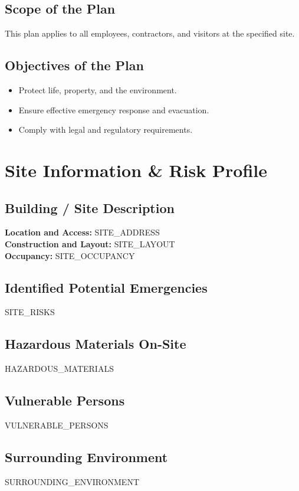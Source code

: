 \documentclass[12pt]{article}
\begin{document}
\subsection{Scope of the Plan}
This plan applies to all employees, contractors, and visitors at the specified site.

\subsection{Objectives of the Plan}
\begin{itemize}
    \item Protect life, property, and the environment.
    \item Ensure effective emergency response and evacuation.
    \item Comply with legal and regulatory requirements.
\end{itemize}

\section{Site Information \& Risk Profile}

\subsection{Building / Site Description}
\textbf{Location and Access:} {{SITE_ADDRESS}}\\
\textbf{Construction and Layout:} {{SITE_LAYOUT}}\\
\textbf{Occupancy:} {{SITE_OCCUPANCY}}

\subsection{Identified Potential Emergencies}
{{SITE_RISKS}}

\subsection{Hazardous Materials On-Site}
{{HAZARDOUS_MATERIALS}}

\subsection{Vulnerable Persons}
{{VULNERABLE_PERSONS}}

\subsection{Surrounding Environment}
{{SURROUNDING_ENVIRONMENT}}
\end{document}
